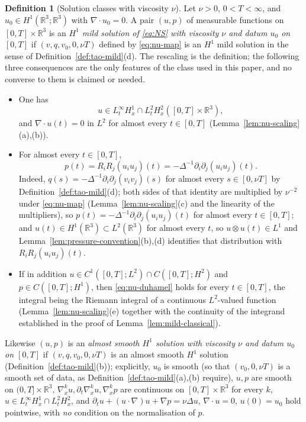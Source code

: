 \documentclass[11pt]{article}
\theoremstyle{definition}
\newtheorem{definition}[theorem]{Definition}
\theoremstyle{plain}
\newcommand{\R}{\mathbb R}
\begin{document}
\begin{definition}[Solution classes with viscosity $\nu$]\label{def:nu-mild}
Let $\nu>0$, $0<T<\infty$, and $u_0\in H^1(\R^3;\R^3)$ with
$\nabla\cdot u_0=0$.  A pair $(u,p)$ of measurable functions on
$[0,T]\times\R^3$ is an \emph{$H^1$ mild solution of \eqref{eq:NS} with
viscosity $\nu$ and datum $u_0$ on $[0,T]$} if $(v,q,v_0,0,\nu T)$ defined
by \eqref{eq:nu-map} is an $H^1$ mild solution in the sense of
Definition~\ref{def:tao-mild}(d).
The rescaling is the definition; the following three consequences are the
only features of the class used in this paper, and no converse to them is
claimed or needed.
\begin{itemize}
\item[($\nu$1)] One has
\[
 u\in L^\infty_tH^1_x\cap L^2_tH^2_x([0,T]\times\R^3),
\]
and $\nabla\cdot u(t)=0$ in $L^2$ for almost every $t\in[0,T]$
(Lemma~\ref{lem:nu-scaling}(a),(b)).
\item[($\nu$2)] For almost every $t\in[0,T]$,
\[
 p(t)=R_iR_j(u_iu_j)(t)=-\Delta^{-1}\partial_i\partial_j(u_iu_j)(t).
\]
Indeed, $q(s)=-\Delta^{-1}\partial_i\partial_j(v_iv_j)(s)$ for almost every
$s\in[0,\nu T]$ by Definition~\ref{def:tao-mild}(d); both sides of that
identity are multiplied by $\nu^{-2}$ under \eqref{eq:nu-map}
(Lemma~\ref{lem:nu-scaling}(c) and the linearity of the multipliers), so
$p(t)=-\Delta^{-1}\partial_i\partial_j(u_iu_j)(t)$ for almost every
$t\in[0,T]$; and $u(t)\in H^1(\R^3)\subset L^2(\R^3)$ for almost every $t$,
so $u\otimes u(t)\in L^1$ and
Lemma~\ref{lem:pressure-convention}(b),(d) identifies that distribution with
$R_iR_j(u_iu_j)(t)$.
\item[($\nu$3)] If in addition $u\in C^1([0,T];L^2)\cap C([0,T];H^2)$ and
$p\in C([0,T];H^1)$, then \eqref{eq:nu-duhamel} holds for every
$t\in[0,T]$, the integral being the Riemann integral of a continuous
$L^2$-valued function (Lemma~\ref{lem:nu-scaling}(e) together with the
continuity of the integrand established in the proof of
Lemma~\ref{lem:mild-classical}).
\end{itemize}
\begin{sloppypar}
Likewise $(u,p)$ is an \emph{almost smooth $H^1$ solution with viscosity
$\nu$ and datum $u_0$ on $[0,T]$} if $(v,q,v_0,0,\nu T)$ is an almost
smooth $H^1$ solution (Definition~\ref{def:tao-mild}(b)); explicitly,
$u_0$ is smooth (so that $(v_0,0,\nu T)$ is a smooth set of data, as
Definition~\ref{def:tao-mild}(a),(b) require), $u,p$ are smooth on
$(0,T]\times\R^3$, $\nabla_x^ku,\partial_t\nabla_x^ku,\nabla_x^kp$ are
continuous on $[0,T]\times\R^3$ for every $k$, $u\in L^\infty_tH^1_x\cap
L^2_tH^2_x$, and $\partial_tu+(u\cdot\nabla)u+\nabla p=\nu\Delta u$,
$\nabla\cdot u=0$, $u(0)=u_0$ hold pointwise, with \emph{no} condition on
the normalisation of $p$.
\end{sloppypar}
\end{definition}
\end{document}
